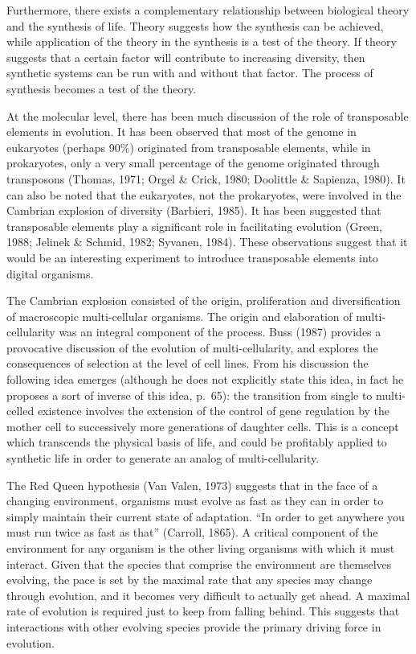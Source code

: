 Furthermore, there exists a complementary relationship between biological
theory and the synthesis of life.  Theory suggests how the
synthesis can be achieved, while application of the theory in the synthesis
is a test of the theory.  If theory suggests that a certain factor will
contribute to increasing diversity, then synthetic systems can be run
with and without that factor.  The process of synthesis becomes a test
of the theory.

At the molecular level, there has been much discussion of the role of
transposable elements in evolution.  It has been observed that most of the
genome in eukaryotes (perhaps 90\%) originated from transposable elements,
while in prokaryotes, only a very small percentage of the genome originated
through transposons (Thomas, 1971; Orgel \& Crick, 1980; Doolittle \&
Sapienza, 1980).  It can also be noted that the eukaryotes, not the
prokaryotes, were involved in the Cambrian explosion of diversity (Barbieri,
1985).  It has been suggested that transposable elements play a significant
role in facilitating evolution (Green, 1988; Jelinek \& Schmid, 1982;
Syvanen, 1984).  These observations suggest that it would be an interesting
experiment to introduce transposable elements into digital organisms.

The Cambrian explosion consisted of the origin, proliferation and
diversification of macroscopic multi-cellular organisms.  The origin and
elaboration of multi-cellularity was an integral component of the process.
Buss (1987) provides a provocative discussion of the evolution of
multi-cellularity, and explores the consequences of selection at the level
of cell lines.  From his discussion the following idea emerges (although
he does not explicitly state this idea, in fact he proposes a sort of
inverse of this idea, p.\ 65): the transition from single to multi-celled
existence involves the extension of the control of gene regulation by the
mother cell to successively more generations of daughter cells.  This is
a concept which transcends the physical basis of life, and could be
profitably applied to synthetic life in order to generate an analog of
multi-cellularity.

The Red Queen hypothesis (Van Valen, 1973) suggests that in the face of a
changing environment, organisms must evolve as fast as they can in order
to simply maintain their current state of adaptation.  ``In order to get
anywhere you must run twice as fast as that'' (Carroll, 1865).  A critical
component of the environment for any organism is the other living organisms
with which it must interact.  Given that the species that comprise the
environment are themselves evolving, the pace is set by the maximal rate
that any species may change through evolution, and it becomes very difficult
to actually get ahead.  A maximal rate of evolution is required just to keep
from falling behind.  This suggests that interactions with other evolving
species provide the primary driving force in evolution.

